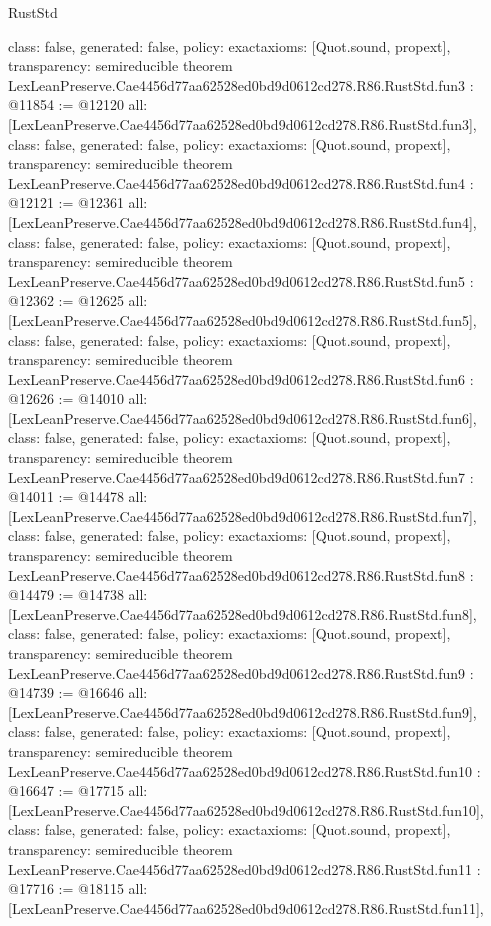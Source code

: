 \begin{lexlean}{RustStd}
\begin{coremodule}
{  class: false,
  generated: false,
  policy: exact{axioms: [Quot.sound, propext]},
  transparency: semireducible
}
theorem LexLeanPreserve.Cae4456d77aa62528ed0bd9d0612cd278.R86.RustStd.fun3 : @11854 := @12120 {
  all: [LexLeanPreserve.Cae4456d77aa62528ed0bd9d0612cd278.R86.RustStd.fun3],
  class: false,
  generated: false,
  policy: exact{axioms: [Quot.sound, propext]},
  transparency: semireducible
}
theorem LexLeanPreserve.Cae4456d77aa62528ed0bd9d0612cd278.R86.RustStd.fun4 : @12121 := @12361 {
  all: [LexLeanPreserve.Cae4456d77aa62528ed0bd9d0612cd278.R86.RustStd.fun4],
  class: false,
  generated: false,
  policy: exact{axioms: [Quot.sound, propext]},
  transparency: semireducible
}
theorem LexLeanPreserve.Cae4456d77aa62528ed0bd9d0612cd278.R86.RustStd.fun5 : @12362 := @12625 {
  all: [LexLeanPreserve.Cae4456d77aa62528ed0bd9d0612cd278.R86.RustStd.fun5],
  class: false,
  generated: false,
  policy: exact{axioms: [Quot.sound, propext]},
  transparency: semireducible
}
theorem LexLeanPreserve.Cae4456d77aa62528ed0bd9d0612cd278.R86.RustStd.fun6 : @12626 := @14010 {
  all: [LexLeanPreserve.Cae4456d77aa62528ed0bd9d0612cd278.R86.RustStd.fun6],
  class: false,
  generated: false,
  policy: exact{axioms: [Quot.sound, propext]},
  transparency: semireducible
}
theorem LexLeanPreserve.Cae4456d77aa62528ed0bd9d0612cd278.R86.RustStd.fun7 : @14011 := @14478 {
  all: [LexLeanPreserve.Cae4456d77aa62528ed0bd9d0612cd278.R86.RustStd.fun7],
  class: false,
  generated: false,
  policy: exact{axioms: [Quot.sound, propext]},
  transparency: semireducible
}
theorem LexLeanPreserve.Cae4456d77aa62528ed0bd9d0612cd278.R86.RustStd.fun8 : @14479 := @14738 {
  all: [LexLeanPreserve.Cae4456d77aa62528ed0bd9d0612cd278.R86.RustStd.fun8],
  class: false,
  generated: false,
  policy: exact{axioms: [Quot.sound, propext]},
  transparency: semireducible
}
theorem LexLeanPreserve.Cae4456d77aa62528ed0bd9d0612cd278.R86.RustStd.fun9 : @14739 := @16646 {
  all: [LexLeanPreserve.Cae4456d77aa62528ed0bd9d0612cd278.R86.RustStd.fun9],
  class: false,
  generated: false,
  policy: exact{axioms: [Quot.sound, propext]},
  transparency: semireducible
}
theorem LexLeanPreserve.Cae4456d77aa62528ed0bd9d0612cd278.R86.RustStd.fun10 : @16647 := @17715 {
  all: [LexLeanPreserve.Cae4456d77aa62528ed0bd9d0612cd278.R86.RustStd.fun10],
  class: false,
  generated: false,
  policy: exact{axioms: [Quot.sound, propext]},
  transparency: semireducible
}
theorem LexLeanPreserve.Cae4456d77aa62528ed0bd9d0612cd278.R86.RustStd.fun11 : @17716 := @18115 {
  all: [LexLeanPreserve.Cae4456d77aa62528ed0bd9d0612cd278.R86.RustStd.fun11],
}
\end{coremodule}
\end{lexlean}
